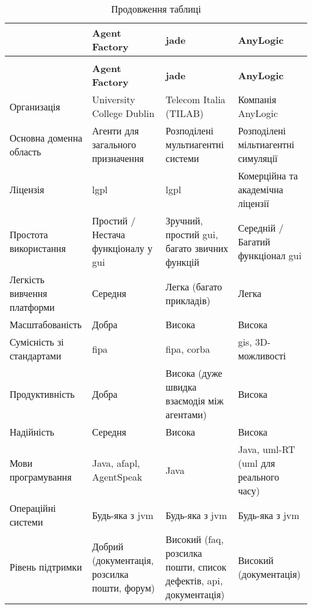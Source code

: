 {
	\small
	\tabulinesep=1.2mm
	\begin{longtabu} to \textwidth {|X[2,l]|X[2,l]|X[3,l]|X[3,l]|}
  		\caption{Порівняння платформ для розробки \acrshort{mas}~\cite{Kravari2015}}
  		\label{tab:mas_platform_comparsion} \\
		\hline
		& \textbf{Agent Factory} & \textbf{\acrshort{jade}} & \textbf{AnyLogic} \\\hline\endfirsthead
  		\caption*{Продовження таблиці \thetable{}}\\
		\hline
		& \textbf{Agent Factory} & \textbf{\acrshort{jade}} & \textbf{AnyLogic} \\\hline\endhead
		Организація & University College Dublin & Telecom Italia (TILAB) & Компанія AnyLogic \\\hline
		Основна доменна область & Агенти для загального призначення & Розподілені мультиагентні системи & Розподілені мільтиагентні симуляції \\\hline
		Ліцензія & \acrshort{lgpl} & \acrshort{lgpl} & Комерційна та академічна ліцензії \\
		\hline
		Простота використання & Простий / Нестача функціоналу у \acrshort{gui} & Зручний, простий \acrshort{gui}, багато звичних функцій & Середній / Багатий функціонал \acrshort{gui} \\\hline
		Легкість вивчення платформи & Середня & Легка (багато прикладів) & Легка \\\hline
		Масштабованість & Добра & Висока & Висока \\\hline
		Сумісність зі стандартами & \acrshort{fipa} & \acrshort{fipa}, \acrshort{corba} & \acrshort{gis}, 3D-можливості \\
		\hline
		Продуктивність & Добра & Висока (дуже швидка взаємодія між агентами) & Висока \\\hline
		Надійність & Середня & Висока & Висока \\\hline
		Мови програмування & Java, \acrshort{afapl}, AgentSpeak & Java & Java, \acrshort{uml}-RT (\acrshort{uml} для реального часу) \\\hline
		Операційні системи & Будь-яка з \acrshort{jvm} & Будь-яка з \acrshort{jvm} & Будь-яка з \acrshort{jvm} \\
		\hline
		Рівень підтримки & Добрий (документація, розсилка пошти, форум) & Високий (\acrshort{faq}, розсилка пошти, список дефектів, \acrshort{api}, документація) & Високий (документація) \\\hline

\end{longtabu}}
